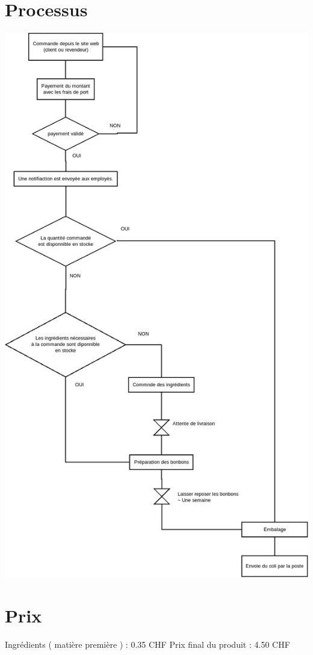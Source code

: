 \documentclass{article}
\begin{document}
\section{Processus}
\includegraphics[scale=0.4]{../processus_de_commande.png} 

\section{Prix}
Ingrédients ( matière première ) : 0.35 CHF 
Prix final du produit :  4.50 CHF
\end{document}
